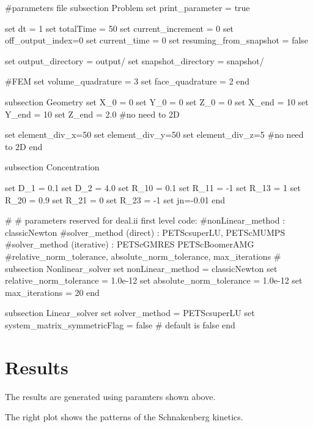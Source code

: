 \begin{DoxyCode}
\textcolor{preprocessor}{#parameters file}
\textcolor{preprocessor}{}
subsection Problem
set print\_parameter = \textcolor{keyword}{true}

set dt = 1
set totalTime = 50
set current\_increment = 0
set off\_output\_index=0
set current\_time = 0
set resuming\_from\_snapshot = \textcolor{keyword}{false}

set output\_directory = output/
set snapshot\_directory = snapshot/

\textcolor{preprocessor}{#FEM}
\textcolor{preprocessor}{}set volume\_quadrature = 3 
set face\_quadrature = 2 
end

subsection Geometry
set X\_0 = 0
set Y\_0 = 0
set Z\_0 = 0
set X\_end = 10
set Y\_end = 10
set Z\_end = 2.0 #no need to 2D

set element\_div\_x=50
set element\_div\_y=50
set element\_div\_z=5 #no need to 2D
end

subsection Concentration

set D\_1 = 0.1
set D\_2 = 4.0
set R\_10 = 0.1
set R\_11 = -1
set R\_13 = 1
set R\_20 = 0.9
set R\_21 = 0
set R\_23 = -1
set jn=-0.01
end
                        
\textcolor{preprocessor}{#}
\textcolor{preprocessor}{}\textcolor{preprocessor}{# parameters reserved for deal.ii first level code:}
\textcolor{preprocessor}{}\textcolor{preprocessor}{#nonLinear\_method : classicNewton}
\textcolor{preprocessor}{}\textcolor{preprocessor}{#solver\_method (direct) : PETScsuperLU, PETScMUMPS}
\textcolor{preprocessor}{}\textcolor{preprocessor}{#solver\_method (iterative) : PETScGMRES PETScBoomerAMG}
\textcolor{preprocessor}{}\textcolor{preprocessor}{#relative\_norm\_tolerance, absolute\_norm\_tolerance, max\_iterations}
\textcolor{preprocessor}{}\textcolor{preprocessor}{#}
\textcolor{preprocessor}{}subsection Nonlinear\_solver
        set nonLinear\_method = classicNewton
        set relative\_norm\_tolerance = 1.0e-12
        set absolute\_norm\_tolerance = 1.0e-12
        set max\_iterations = 20
end
                        
subsection Linear\_solver
        set solver\_method = PETScsuperLU
        set system\_matrix\_symmetricFlag = \textcolor{keyword}{false} # \textcolor{keywordflow}{default} is \textcolor{keyword}{false}
end
\end{DoxyCode}
\hypertarget{growth_results}{}\section{Results}\label{growth_results}
The results are generated using paramters shown above.

The right plot shows the patterns of the Schnakenberg kinetics.   